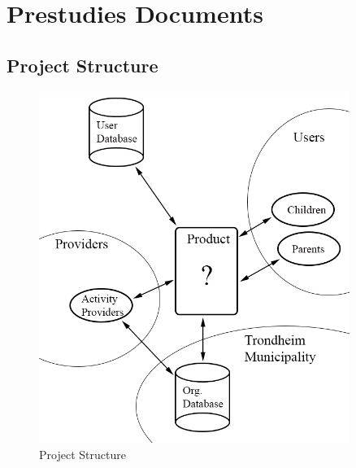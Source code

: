 \chapter{Prestudies Documents}


\section{Project Structure}
\label{project_structure}

\begin{figure}[H]
\centering
    \includegraphics[width=0.9\textwidth]{fig/arkitektur.png}
\caption{Project Structure}
\label{Project_Structure_Diagram}
\end{figure}